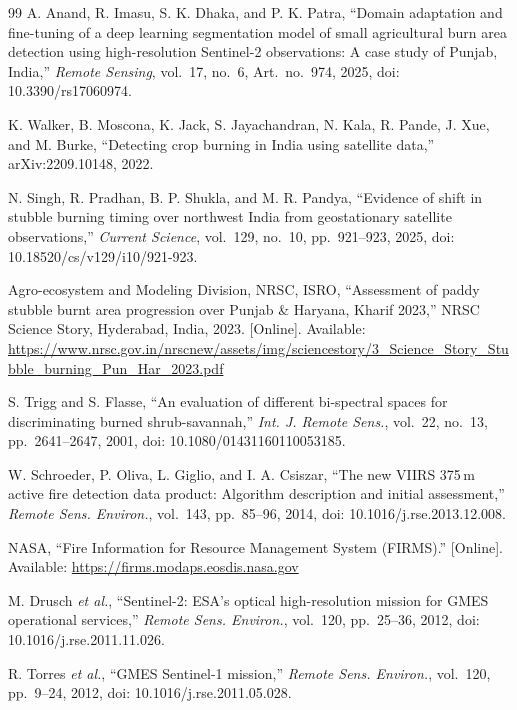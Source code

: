 \documentclass[conference]{IEEEtran}
\begin{document}
\begin{thebibliography}{99}
 A. Anand, R. Imasu, S. K. Dhaka, and P. K. Patra, ``Domain adaptation and
fine-tuning of a deep learning segmentation model of small agricultural burn area detection using
high-resolution Sentinel-2 observations: A case study of Punjab, India,'' \emph{Remote Sensing},
vol.~17, no.~6, Art.~no.~974, 2025, doi: 10.3390/rs17060974.

 K. Walker, B. Moscona, K. Jack, S. Jayachandran, N. Kala, R. Pande, J. Xue,
and M. Burke, ``Detecting crop burning in India using satellite data,'' arXiv:2209.10148, 2022.

 N. Singh, R. Pradhan, B. P. Shukla, and M. R. Pandya, ``Evidence of shift in
stubble burning timing over northwest India from geostationary satellite observations,''
\emph{Current Science}, vol.~129, no.~10, pp.~921--923, 2025,
doi: 10.18520/cs/v129/i10/921-923.

 Agro-ecosystem and Modeling Division, NRSC, ISRO, ``Assessment of paddy stubble
burnt area progression over Punjab \& Haryana, Kharif 2023,'' NRSC Science Story, Hyderabad,
India, 2023. [Online]. Available:
\url{https://www.nrsc.gov.in/nrscnew/assets/img/sciencestory/3_Science_Story_Stubble_burning_Pun_Har_2023.pdf}

 S. Trigg and S. Flasse, ``An evaluation of different bi-spectral spaces for
discriminating burned shrub-savannah,'' \emph{Int. J. Remote Sens.}, vol.~22, no.~13,
pp.~2641--2647, 2001, doi: 10.1080/01431160110053185.

 W. Schroeder, P. Oliva, L. Giglio, and I. A. Csiszar, ``The new VIIRS
375\,m active fire detection data product: Algorithm description and initial assessment,''
\emph{Remote Sens. Environ.}, vol.~143, pp.~85--96, 2014, doi: 10.1016/j.rse.2013.12.008.

 NASA, ``Fire Information for Resource Management System (FIRMS).'' [Online].
Available: \url{https://firms.modaps.eosdis.nasa.gov}

 M. Drusch \emph{et al.}, ``Sentinel-2: ESA's optical high-resolution mission
for GMES operational services,'' \emph{Remote Sens. Environ.}, vol.~120, pp.~25--36, 2012,
doi: 10.1016/j.rse.2011.11.026.

 R. Torres \emph{et al.}, ``GMES Sentinel-1 mission,'' \emph{Remote Sens.
Environ.}, vol.~120, pp.~9--24, 2012, doi: 10.1016/j.rse.2011.05.028.


\end{thebibliography}
\end{document}
